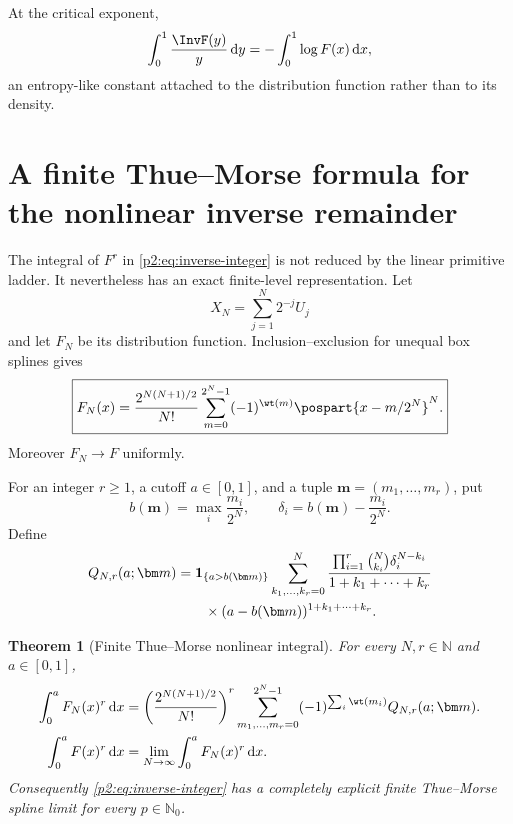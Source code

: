 \documentclass[11pt,oneside]{article}
\newtheorem{theorem}{Theorem}[section]
\theoremstyle{definition}
\theoremstyle{remark}
\newcommand{\N}{\mathbb N}
\newcommand{\dd}{\,\mathrm d}
\newcommand{\1}{\mathbf 1}
\begin{document}
At the critical exponent,
\begin{equation}
 \int_0^1\frac{\InvF(y)}y\dd y=-\int_0^1\log F(x)\dd x,   \label{p2:eq:inverse-log-constant}
\end{equation}
an entropy-like constant attached to the distribution function rather than to
its density.

\section{A finite Thue--Morse formula for the nonlinear inverse remainder}
\label{p2:sec:nonlinear-spline}

The integral of $F^r$ in \eqref{p2:eq:inverse-integer} is not reduced by the linear
primitive ladder.  It nevertheless has an exact finite-level representation.
Let
\begin{equation}
 X_N=\sum_{j=1}^{N}2^{-j}U_j
\end{equation}
and let $F_N$ be its distribution function.  Inclusion--exclusion for unequal
box splines gives
\begin{equation}
 \boxed{
 F_N(x)=\frac{2^{N(N+1)/2}}{N!}
 \sum_{m=0}^{2^N-1}(-1)^{\wt(m)}
 \pospart{x-m/2^N}^{N}.}                                  \label{p2:eq:finite-FN}
\end{equation}
Moreover $F_N\to F$ uniformly.

For an integer $r\ge1$, a cutoff $a\in[0,1]$, and a tuple
$\bm m=(m_1,\ldots,m_r)$, put
\begin{equation}
 b(\bm m)=\max_i\frac{m_i}{2^N},\qquad
 \delta_i=b(\bm m)-\frac{m_i}{2^N}.                       \label{p2:eq:b-delta}
\end{equation}
Define
\begin{align}
 Q_{N,r}(a;\bm m)
 &=\mathbf 1_{\{a>b(\bm m)\}}
 \sum_{k_1,\ldots,k_r=0}^{N}
 \frac{\prod_{i=1}^{r}\binom N{k_i}\delta_i^{N-k_i}}
 {1+k_1+\cdots+k_r}                                       \notag\\
 &\qquad\times(a-b(\bm m))^{1+k_1+\cdots+k_r}.           \label{p2:eq:Q-Nr}
\end{align}

\begin{theorem}[Finite Thue--Morse nonlinear integral]
\label{p2:thm:finite-nonlinear}
For every $N,r\in\N$ and $a\in[0,1]$,
\begin{align}
 \int_0^aF_N(x)^r\dd x
 &=\left(\frac{2^{N(N+1)/2}}{N!}\right)^r
 \sum_{m_1,\ldots,m_r=0}^{2^N-1}
 (-1)^{\sum_i\wt(m_i)}Q_{N,r}(a;\bm m).                  \label{p2:eq:finite-nonlinear}\\
 \int_0^aF(x)^r\dd x
 &=\lim_{N\to\infty}\int_0^aF_N(x)^r\dd x.              \label{p2:eq:nonlinear-limit}
\end{align}
Consequently \eqref{p2:eq:inverse-integer} has a completely explicit finite
Thue--Morse spline limit for every $p\in\N_0$.
\end{theorem}
\end{document}
